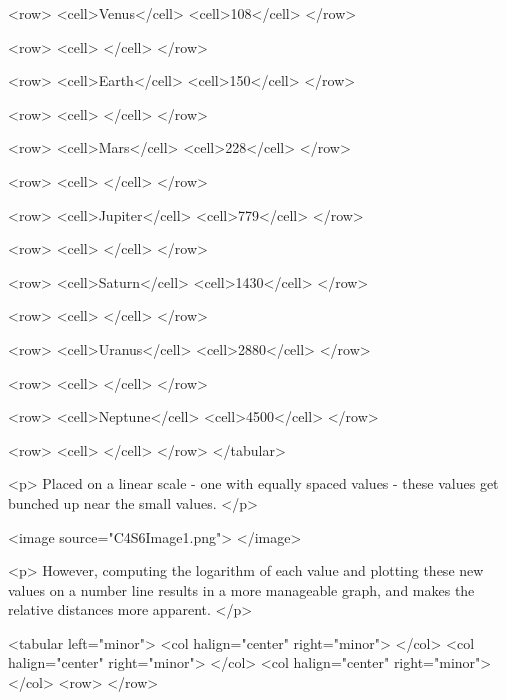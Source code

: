             <row>
                <cell>Venus</cell>
                <cell>108</cell>
            </row>

            <row>
                <cell> </cell>
            </row>

            <row>
                <cell>Earth</cell>
                <cell>150</cell>
            </row>

            <row>
                <cell> </cell>
            </row>

            <row>
                <cell>Mars</cell>
                <cell>228</cell>
            </row>

            <row>
                <cell> </cell>
            </row>

            <row>
                <cell>Jupiter</cell>
                <cell>779</cell>
            </row>

            <row>
                <cell> </cell>
            </row>

            <row>
                <cell>Saturn</cell>
                <cell>1430</cell>
            </row>

            <row>
                <cell> </cell>
            </row>

            <row>
                <cell>Uranus</cell>
                <cell>2880</cell>
            </row>

            <row>
                <cell> </cell>
            </row>

            <row>
                <cell>Neptune</cell>
                <cell>4500</cell>
            </row>

            <row>
                <cell> </cell>
            </row>
        </tabular>

        <p>
            Placed on a linear scale - one with equally spaced values - these values get bunched up near the small values.
        </p>

        <image source="C4S6Image1.png">
        </image>

        <p>
            However, computing the logarithm of each value and plotting these new values on a number line results in a more manageable graph, and makes the relative distances more apparent.
        </p>

        <tabular left="minor">
            <col halign="center" right="minor"> </col> <col halign="center" right="minor"> </col> <col halign="center" right="minor"> </col>
            <row>
            </row>

